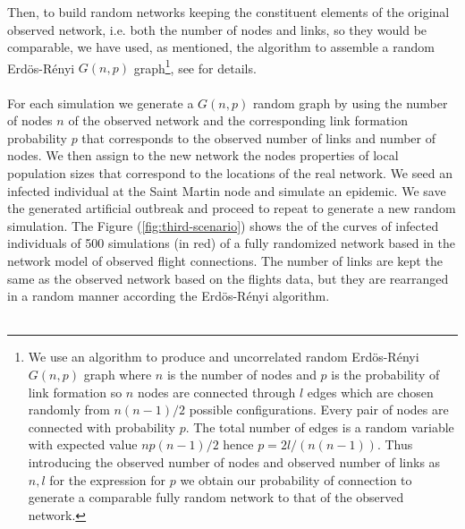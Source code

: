 \documentclass[10pt,a4paper]{article}
\begin{document}
Then, to build random networks keeping the constituent elements of the original observed network, i.e. both the number of nodes and links, so they would be comparable, we have used, as mentioned, the algorithm to assemble a random Erd\"{o}s-R\'{e}nyi $G(n,p)$ graph\footnote{ 
We use an algorithm to produce and uncorrelated random Erd\"{o}s-R\'{e}nyi $G(n,p)$ graph where $n$ is the number of nodes and $p$ is the probability of link formation so $n$ nodes are connected through $l$ edges which are chosen randomly from $n(n-1)/2$ possible configurations. Every pair of nodes are connected with probability $p$. The total number of edges is a random variable with expected value $np(n-1)/2$ hence $p = 2l/(n(n-1))$. Thus introducing the observed number of nodes and observed number of links as $n,l$ for the expression for $p$ we obtain our probability of connection to generate a comparable fully random network to that of the observed network.}, see \citep{mej2010networks, jackson2010social} for details.
\\\\
For each simulation we generate a $G(n,p)$ random graph by using the number of nodes $n$ of the observed network and the corresponding link formation probability $p$ that corresponds to the observed number of links and number of nodes. We then assign to the new network the nodes properties of local population sizes that correspond to the locations of the real network. We seed an infected individual at the Saint Martin node and simulate an epidemic. We save the generated artificial outbreak and proceed to repeat to generate a new random simulation.
% 
The Figure (\ref{fig:third-scenario}) shows the of the curves of infected individuals of 500 simulations (in red) of a fully randomized network based in the network model of observed flight connections. The number of links are kept the same as the observed network based on the flights data, but they are rearranged in a random manner according the Erd\"{o}s-R\'{e}nyi algorithm. 
%
%
\\\\
\end{document}
